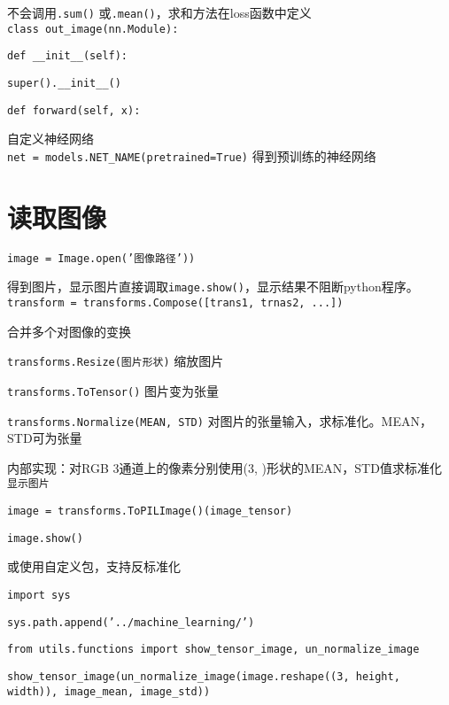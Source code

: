 \documentclass[UTF8]{ctexart}
\begin{document}
  不会调用\texttt{.sum()} 或\texttt{.mean()}，求和方法在loss函数中定义\\
\texttt{class out\_image(nn.Module):}

  \texttt{def \_\_init\_\_(self):}

  \quad \texttt{super().\_\_init\_\_()}

  \texttt{def forward(self, x):}

  \quad 自定义神经网络\\
\texttt{net = models.NET\_NAME(pretrained=True)} 得到预训练的神经网络\\


\section{读取图像}
\noindent \texttt{image = Image.open('图像路径'))}

  得到图片，显示图片直接调取\texttt{image.show()}，显示结果不阻断python程序。\\
\texttt{transform = transforms.Compose([trans1, trnas2, ...])}

  合并多个对图像的变换

  \texttt{transforms.Resize(图片形状)} 缩放图片

  \texttt{transforms.ToTensor()} 图片变为张量

  \texttt{transforms.Normalize(MEAN, STD)} 对图片的张量输入，求标准化。MEAN，STD可为张量
  
  \quad 内部实现：对RGB 3通道上的像素分别使用(3, )形状的MEAN，STD值求标准化\\
\texttt{显示图片}

  \texttt{image = transforms.ToPILImage()(image\_tensor)}

  \texttt{image.show()}
  
  \quad 或使用自定义包，支持反标准化

  \texttt{import sys}

  \texttt{sys.path.append('../machine\_learning/')}

  \texttt{from utils.functions import show\_tensor\_image, un\_normalize\_image}

  \texttt{show\_tensor\_image(un\_normalize\_image(image.reshape((3, height, width)), image\_mean, image\_std))}

\end{document}
